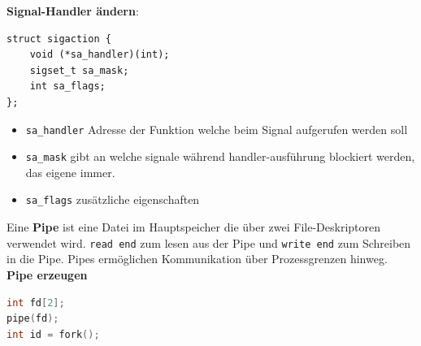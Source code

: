 \documentclass[8pt]{extarticle}
\let\oldtextbf\textbf
\renewcommand{\textbf}{\tiny\oldtextbf}
\begin{document}
\begin{multicols*}{5}
	\textbf{Signal-Handler ändern}:
	\begin{lstlisting}
struct sigaction {
	void (*sa_handler)(int);
	sigset_t sa_mask;
	int sa_flags;
};
	\end{lstlisting}
	\begin{itemize}[noitemsep, topsep=0pt, leftmargin=*]
		\item \texttt{sa\_handler} Adresse der Funktion welche beim Signal aufgerufen werden soll
		\item \texttt{sa\_mask} gibt an welche signale während handler-ausführung blockiert werden, das eigene immer.
		\item \texttt{sa\_flags} zusätzliche eigenschaften
	\end{itemize}
	\vspace{5pt}
	Eine \textbf{Pipe} ist eine Datei im Hauptspeicher die über zwei File-Deskriptoren verwendet wird. \texttt{read end} zum lesen aus der Pipe und \texttt{write end} zum Schreiben in die Pipe. Pipes ermöglichen Kommunikation über Prozessgrenzen hinweg.\\
	\textbf{Pipe erzeugen} %
	\begin{lstlisting}[language=c] 
int fd[2];
pipe(fd);
int id = fork();


\end{lstlisting}
\end{multicols*}
\end{document}
